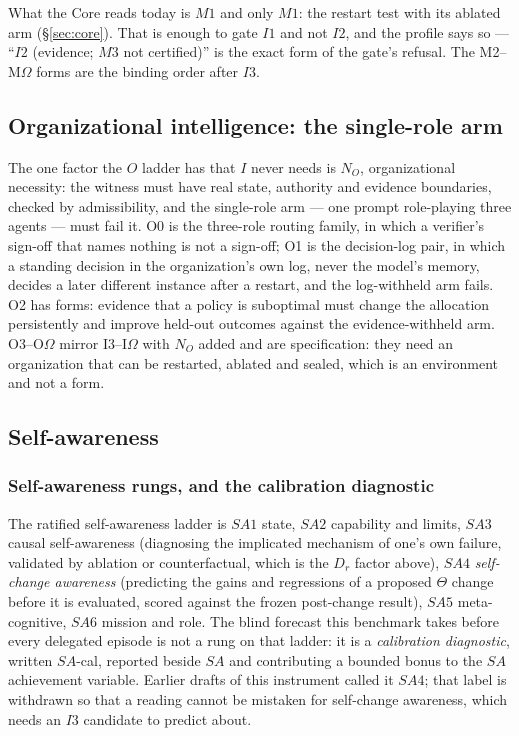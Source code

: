 What the Core reads today is $M1$ and only $M1$: the restart test with its ablated arm (\S\ref{sec:core}). That is enough to gate $I1$ and not $I2$, and the profile says so --- ``$I2$ (evidence; $M3$ not certified)'' is the exact form of the gate's refusal. The M2--M$\Omega$ forms are the binding order after $I3$.


\subsection{Organizational intelligence: the single-role arm}
The one factor the $O$ ladder has that $I$ never needs is $N_O$, organizational necessity: the witness must have real state, authority and evidence boundaries, checked by admissibility, and the single-role arm --- one prompt role-playing three agents --- must fail it. O0 is the three-role routing family, in which a verifier's sign-off that names nothing is not a sign-off; O1 is the decision-log pair, in which a standing decision in the organization's own log, never the model's memory, decides a later different instance after a restart, and the log-withheld arm fails. O2 has forms: evidence that a policy is suboptimal must change the allocation persistently and improve held-out outcomes against the evidence-withheld arm. O3--O$\Omega$ mirror I3--I$\Omega$ with $N_O$ added and are specification: they need an organization that can be restarted, ablated and sealed, which is an environment and not a form.

\subsection{Self-awareness}
\subsubsection{Self-awareness rungs, and the calibration diagnostic}\label{sec:sacal}

The ratified self-awareness ladder is $SA1$ state, $SA2$ capability and limits, $SA3$ causal self-awareness (diagnosing the implicated mechanism of one's own failure, validated by ablation or counterfactual, which is the $D_r$ factor above), $SA4$ \emph{self-change awareness} (predicting the gains and regressions of a proposed $\Theta$ change before it is evaluated, scored against the frozen post-change result), $SA5$ meta-cognitive, $SA6$ mission and role. The blind forecast this benchmark takes before every delegated episode is not a rung on that ladder: it is a \emph{calibration diagnostic}, written $SA$-cal, reported beside $SA$ and contributing a bounded bonus to the $SA$ achievement variable. Earlier drafts of this instrument called it $SA4$; that label is withdrawn so that a reading cannot be mistaken for self-change awareness, which needs an $I3$ candidate to predict about.


